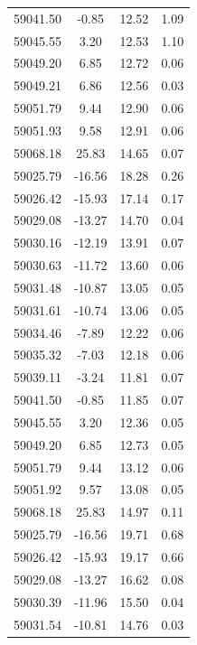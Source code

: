 \begin{longtable}{|c|c|c|c|}
 59041.50 &   -0.85 &       12.52 &          1.09 \\
 59045.55 &    3.20 &       12.53 &          1.10 \\
 59049.20 &    6.85 &       12.72 &          0.06 \\
 59049.21 &    6.86 &       12.56 &          0.03 \\
 59051.79 &    9.44 &       12.90 &          0.06 \\
 59051.93 &    9.58 &       12.91 &          0.06 \\
 59068.18 &   25.83 &       14.65 &          0.07 \\
 59025.79 &  -16.56 &       18.28 &          0.26 \\
 59026.42 &  -15.93 &       17.14 &          0.17 \\
 59029.08 &  -13.27 &       14.70 &          0.04 \\
 59030.16 &  -12.19 &       13.91 &          0.07 \\
 59030.63 &  -11.72 &       13.60 &          0.06 \\
 59031.48 &  -10.87 &       13.05 &          0.05 \\
 59031.61 &  -10.74 &       13.06 &          0.05 \\
 59034.46 &   -7.89 &       12.22 &          0.06 \\
 59035.32 &   -7.03 &       12.18 &          0.06 \\
 59039.11 &   -3.24 &       11.81 &          0.07 \\
 59041.50 &   -0.85 &       11.85 &          0.07 \\
 59045.55 &    3.20 &       12.36 &          0.05 \\
 59049.20 &    6.85 &       12.73 &          0.05 \\
 59051.79 &    9.44 &       13.12 &          0.06 \\
 59051.92 &    9.57 &       13.08 &          0.05 \\
 59068.18 &   25.83 &       14.97 &          0.11 \\
 59025.79 &  -16.56 &       19.71 &          0.68 \\
 59026.42 &  -15.93 &       19.17 &          0.66 \\
 59029.08 &  -13.27 &       16.62 &          0.08 \\
 59030.39 &  -11.96 &       15.50 &          0.04 \\
 59031.54 &  -10.81 &       14.76 &          0.03 \\

\end{longtable}
